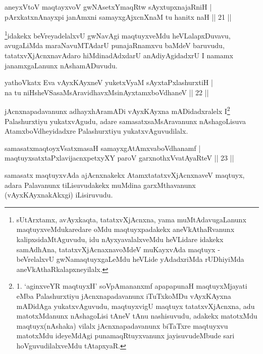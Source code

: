\begin{shl}
aneyxV\s toV maqtayxvoV gwNAsetxYmaqRtw sAyxtupxnajaRniH |\\
pArxkatxnAnayxpi janAmxni samayxgAjxcnXnaM tu hanitx naH \hfill || 21 ||
\end{shl}

\begin{artha}
\footnote{sUtArxtamx, avAyxkaqta, tatatxvXjAcnxna, yama muMtAdavugaLanunx 
maqtuyxveMdukaredare oMdu maqtuyxpadakekx aneVkAthaRvanunx kalipxsidaMtAguvudu, idu 
nAyxyavalalxveMdu heVLidare idakekx samAdhAna, tatatxvXjAcnaxnavoMdeV muKayxvAda maqtuyx -   
beVrelalxvU gwNamaqtuyxgaLeMdu heVLide yAdadxriMda rUDhiyiMda 
aneVkAthaRkalapxneyilalx.}idakekx beVreyadelalxvU gwNavAgi maqtuyxveMdu heVLalapxDuvavu, avugaLiMda maraNavuMTAdarU 
punajaRnamxvu baMdeV baruvudu, tatatxvXjAcnxnavAdaro hiMdinadAdxdarU anAdiyAgidadxrU I namamx 
janamxgaLanunx nAshamADuvudu.
\end{artha}

\begin{shl}
yathoVkatx Eva vAyxKAyxneV yuketxVyaM sAyxtaPxlashurxtiH |\\
na tu niHsheVSasaMsAravidhavxMsinAyxtamxboVdhaneV \hfill || 22 ||
\end{shl}

\begin{artha}
jAcnxnapadavanunx adhayxhAramADi vAyxKAyxna mADidadxralelx I\footnote{1. `aginxveYR maqtuyxH' soV\s pAmananxmf apapapunaH maqtuyxMjayati eMba Palashurxtiyu jAcnxnapadavanunx iTuTxkoMDu vAyxKAyxna mADidAga yukatxvAguvudu, maqtuyxvigU maqtuyx tatatxvXjAcnxna, adu matotxMdanunx nAshagoLisi tAneV tAnu nashisuvudu, adakekx matotxMdu maqtuyx(nAshaka) vilalx jAcnxnapadavanunx biTaTxre maqtuyxvu matotxMdu ideyeMdAgi punamaqRtuyxvanunx jayisuvudeMbude sari hoVguvudilalxveMdu tAtapxyaR.} Palashurxtiyu yukatxvAgudu, adare samasatxsaMsAravanunx nAshagoLi\-suva AtamxboVdheyidadxre Palashurxtiyu yukatxvAguvudilalx.
\end{artha}


\begin{shl}
samasatxmaqtoyxVsatxmasaH samayxgAtAmxvaboVdhanamf |\\
maqtuyxsatxtaPxlavijacnxpetxyXY paroV garxnothxV\s vatAyaRteV \hfill || 23 ||
\end{shl}

\begin{artha}
samasatx maqtuyxvAda ajAcnxnakekx AtamxtatatxvXjAcnxnaveV maqtuyx, adara Palavanunx tiLisuvudakekx muMdina garxMthavanunx (vAyxKAyxnakAkxgi) iLisiruvudu.
\end{artha}

